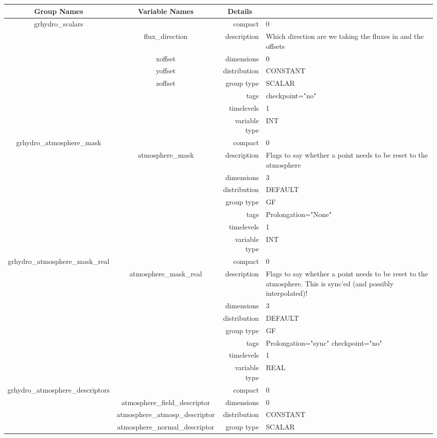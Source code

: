 \documentclass{article}
\begin{document}
\begin{tabular*}{150mm}{|c|c@{\extracolsep{\fill}}|rl|} \hline 
~ {\bf Group Names} ~ & ~ {\bf Variable Names} ~  &{\bf Details} ~ & ~ \\ 
\hline 
grhydro\_scalars &  & compact & 0 \\ 
 & flux\_direction & description & Which direction are we taking the fluxes in and the offsets \\ 
 & xoffset & dimensions & 0 \\ 
 & yoffset & distribution & CONSTANT \\ 
 & zoffset & group type & SCALAR \\ 
 &  & tags & checkpoint="no" \\ 
 &  & timelevels & 1 \\ 
 &  & variable type & INT \\ 
\hline 
grhydro\_atmosphere\_mask &  & compact & 0 \\ 
 & atmosphere\_mask & description & Flags to say whether a point needs to be reset to the atmosphere \\ 
 &  & dimensions & 3 \\ 
 &  & distribution & DEFAULT \\ 
 &  & group type & GF \\ 
 &  & tags & Prolongation="None" \\ 
 &  & timelevels & 1 \\ 
 &  & variable type & INT \\ 
\hline 
grhydro\_atmosphere\_mask\_real &  & compact & 0 \\ 
 & atmosphere\_mask\_real & description & Flags to say whether a point needs to be reset to the atmosphere. This is sync'ed (and possibly interpolated)! \\ 
 &  & dimensions & 3 \\ 
 &  & distribution & DEFAULT \\ 
 &  & group type & GF \\ 
 &  & tags & Prolongation="sync" checkpoint="no" \\ 
 &  & timelevels & 1 \\ 
 &  & variable type & REAL \\ 
\hline 
grhydro\_atmosphere\_descriptors &  & compact & 0 \\ 
 & atmosphere\_field\_descriptor & dimensions & 0 \\ 
 & atmosphere\_atmosp\_descriptor & distribution & CONSTANT \\ 
 & atmosphere\_normal\_descriptor & group type & SCALAR \\ 

\end{tabular*}
\end{document}

